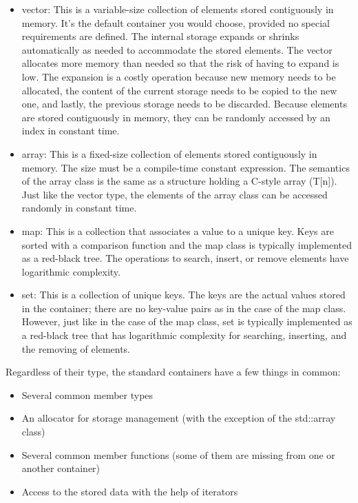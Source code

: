 \begin{itemize}
\item
vector: This is a variable-size collection of elements stored contiguously in memory. It’s the default container you would choose, provided no special requirements are defined. The internal storage expands or shrinks automatically as needed to accommodate the stored elements. The vector allocates more memory than needed so that the risk of having to expand is low. The expansion is a costly operation because new memory needs to be allocated, the content of the current storage needs to be copied to the new one, and lastly, the previous storage needs to be discarded. Because elements are stored contiguously in memory, they can be randomly accessed by an index in constant time.

\item
array: This is a fixed-size collection of elements stored contiguously in memory. The size must be a compile-time constant expression. The semantics of the array class is the same as a structure holding a C-style array (T[n]). Just like the vector type, the elements of the array class can be accessed randomly in constant time.

\item
map: This is a collection that associates a value to a unique key. Keys are sorted with a comparison function and the map class is typically implemented as a red-black tree. The operations to search, insert, or remove elements have logarithmic complexity.

\item
set: This is a collection of unique keys. The keys are the actual values stored in the container; there are no key-value pairs as in the case of the map class. However, just like in the case of the map class, set is typically implemented as a red-black tree that has logarithmic complexity for searching, inserting, and the removing of elements.
\end{itemize}

Regardless of their type, the standard containers have a few things in common:

\begin{itemize}
\item
Several common member types

\item
An allocator for storage management (with the exception of the std::array class)

\item
Several common member functions (some of them are missing from one or another container)

\item
Access to the stored data with the help of iterators
\end{itemize}

